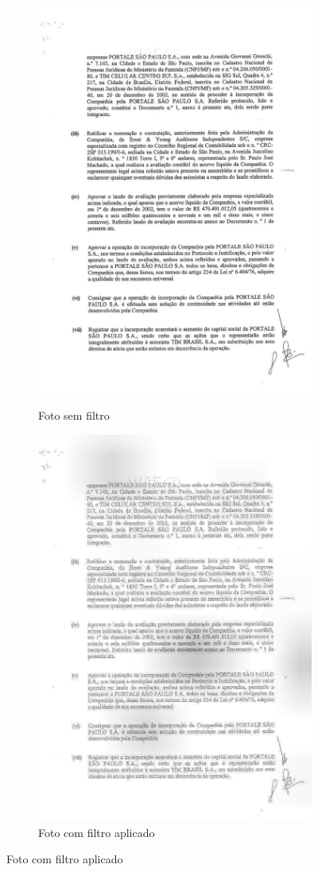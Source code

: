 \begin{figure}[H]
  \centering
  \caption{Diferença entre uma foto original e uma com filtro}
  \begin{subfigure}{.5\textwidth}
    \centering
    \caption{Foto sem filtro}
    \includegraphics[width=0.8\linewidth]{figuras/good-text-image.jpg}
    \label{fig:image-without-filter}
  \end{subfigure}%
  \begin{subfigure}{.5\textwidth}
    \centering
    \caption{Foto com filtro aplicado}
    \includegraphics[width=0.8\linewidth]{figuras/image-with-overlay.jpg}

\end{subfigure}
\end{figure}
